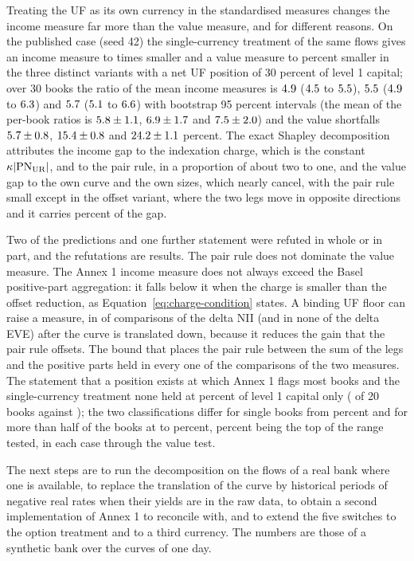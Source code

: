 Treating the UF as its own currency in the standardised measures changes the income measure far more than the value measure, and for different reasons. On the published case (seed 42) the single-currency treatment of the same flows gives an income measure \repRatioLo{} to \repRatioHi{} times smaller and a value measure \repEveShortLo{} to \repEveShortHi{} percent smaller in the three distinct variants with a net UF position of 30 percent of level 1 capital; over 30 books the ratio of the mean income measures is $4.9$ ($4.5$ to $5.5$), $5.5$ ($4.9$ to $6.3$) and $5.7$ ($5.1$ to $6.6$) with bootstrap 95 percent intervals (the mean of the per-book ratios is $5.8\pm1.1$, $6.9\pm1.7$ and $7.5\pm2.0$) and the value shortfalls $5.7\pm0.8$, $15.4\pm0.8$ and $24.2\pm1.1$ percent. The exact Shapley decomposition attributes the income gap to the indexation charge, which is the constant $\kappa|\mathrm{PN}_{\mathrm{UR}}|$, and to the pair rule, in a proportion of about two to one, and the value gap to the own curve and the own sizes, which nearly cancel, with the pair rule small except in the offset variant, where the two legs move in opposite directions and it carries \pairShareEveOff{} percent of the gap.

Two of the predictions and one further statement were refuted in whole or in part, and the refutations are results. The pair rule does not dominate the value measure. The Annex 1 income measure does not always exceed the Basel positive-part aggregation: it falls below it when the charge is smaller than the offset reduction, as Equation~\eqref{eq:charge-condition} states. A binding UF floor can raise a measure, in \floorsRaise{} of \floorsTotalNii{} comparisons of the delta NII (and in none of the delta EVE) after the curve is translated down, because it reduces the gain that the pair rule offsets. The bound that places the pair rule between the sum of the legs and the positive parts held in every one of the \hOneChecked{} comparisons of the two measures. The statement that a position exists at which Annex 1 flags most books and the single-currency treatment none held at \hFourLo{} percent of level 1 capital only (\swElevenFlagAnnex{} of 20 books against \swElevenFlagSingle{}); the two classifications differ for single books from \sweepFirstDiff{} percent and for more than half of the books at \sweepMajLo{} to \sweepMajHi{} percent, \sweepGridHi{} percent being the top of the range tested, in each case through the value test.

The next steps are to run the decomposition on the flows of a real bank where one is available, to replace the translation of the curve by historical periods of negative real rates when their yields are in the raw data, to obtain a second implementation of Annex 1 to reconcile with, and to extend the five switches to the option treatment and to a third currency. The numbers are those of a synthetic bank over the curves of one day.
